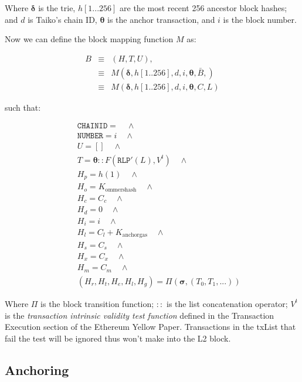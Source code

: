 \documentclass[9pt,oneside]{amsart}
\begin{document}
\begin{multicols}{2}
Where $\boldsymbol{\delta}$ is the trie, $h[1...256]$ are the most recent 256 ancestor block hashes; and $d$ is Taiko's chain ID, $\boldsymbol{\theta}$ is the anchor transaction, and $i$ is the block number.

Now we can define the block mapping function $M$ as:

\begin{eqnarray}
B & \equiv & (H, T, U), \\
\nonumber & \equiv &  M(\boldsymbol{\delta}, h[1..256], {d}, i, \boldsymbol{\theta}, \bar{B}, )  \\
\nonumber & \equiv & M(\boldsymbol{\delta}, h[1..256], {d}, i, \boldsymbol{\theta}, C, L)
\end{eqnarray}


such that:

\begin{eqnarray}
& & \texttt{CHAINID}  = \quad \wedge \\
\nonumber& & \texttt{NUMBER} = {i} \quad \wedge \\
\nonumber& & U = [] \quad \wedge \\
\nonumber& & T =  \boldsymbol{\theta}::F(\texttt{RLP}'(L), V^t) \quad \wedge  \\
\nonumber& & H_p =  h(1) \quad \wedge \\
\nonumber& & H_o =   K_{\mathrm{ommershash}} \quad \wedge \\
\nonumber& & H_c =   C_c \quad \wedge \\
\nonumber& & H_d =   0 \quad \wedge \\
\nonumber& & H_i =   i \quad \wedge \\
\nonumber& & H_l =   C_l + K_{\mathrm{anchorgas}} \quad \wedge \\
\nonumber& & H_s =   C_s \quad \wedge \\
\nonumber& & H_x =   C_x \quad \wedge \\
\nonumber& & H_m =   C_m \quad \wedge \\
\nonumber& & (H_r, H_t, H_e, H_l, H_g) =   \Pi(\boldsymbol{\sigma}, (T_0, T_1, ...))
\end{eqnarray}

Where $\Pi$ is the block transition function; $::$ is the list concatenation operator; $V^t$ is the \textit{transaction intrinsic validity test function} defined in the Transaction Execution section of the Ethereum Yellow Paper. Transactions in the txList that fail the test will be ignored thus won't make into the L2 block.


\subsection{Anchoring} \label{sec:anchoring}


\end{multicols}
\end{document}
